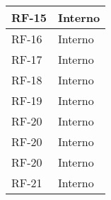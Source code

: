 \begin{longtable}{|>{\centering\arraybackslash}m{}|>{\centering\arraybackslash}m{}|}
	RF-15              & Interno                                                                                                                                                                                                                                              \\\hline
	RF-16              & Interno                                                                                                                                                                                                                                              \\\hline
	RF-17              & Interno                                                                                                                                                                                                                                              \\\hline
	RF-18              & Interno                                                                                                                                                                                                                                              \\\hline
	RF-19              & Interno                                                                                                                                                                                                                                              \\\hline
	RF-20              & Interno                                                                                                                                                                                                                                              \\\hline
	RF-20              & Interno                                                                                                                                                                                                                                              \\\hline
	RF-20              & Interno                                                                                                                                                                                                                                              \\\hline
	RF-21              & Interno                                                                                                                                                                                                                                              \\\hline

\end{longtable}
